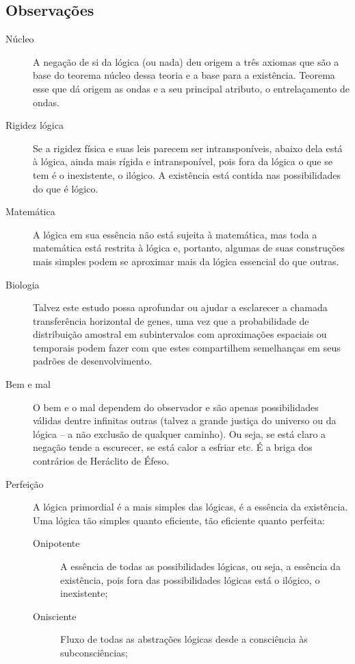\subsection{Observações}
	\begin{description}
	   \item[Núcleo] A negação de si da lógica (ou nada) deu origem a três axiomas que são a base do teorema núcleo dessa teoria e a base para a existência. Teorema esse que dá origem as ondas e a seu principal atributo, o entrelaçamento de ondas. 
	   \item[Rigidez lógica] Se a rigidez física e suas leis parecem ser intransponíveis, abaixo dela está à lógica, ainda mais rígida e intransponível, pois fora da lógica o que se tem é o inexistente, o ilógico. A existência está contida nas possibilidades do que é lógico. 
	   \item[Matemática] A lógica em sua essência não está sujeita à matemática, mas toda a matemática está restrita à lógica e, portanto, algumas de suas construções mais simples podem se aproximar mais da lógica essencial do que outras.
	   \item[Biologia] Talvez este estudo possa aprofundar ou ajudar a esclarecer a chamada transferência horizontal de genes, uma vez que a probabilidade de distribuição amostral em subintervalos com aproximações espaciais ou temporais podem fazer com que estes compartilhem semelhanças em seus padrões de desenvolvimento. 
	   \item[Bem e mal] O bem e o mal dependem do observador e são apenas possibilidades válidas dentre infinitas outras (talvez a grande justiça do universo ou da lógica – a não exclusão de qualquer caminho). Ou seja, se está claro a negação tende a escurecer, se está calor a esfriar etc. É a briga dos contrários de Heráclito de Éfeso. 
	   \item[Perfeição] A lógica primordial é a mais simples das lógicas, é a essência da existência. Uma lógica tão simples quanto eficiente, tão eficiente quanto perfeita:
	   \begin{description}
		   \item[Onipotente] A essência de todas as possibilidades lógicas, ou seja, a essência da existência, pois fora das possibilidades lógicas está o ilógico, o inexistente;
		   \item[Onisciente] Fluxo de todas as abstrações lógicas desde a consciência às subconsciências; 

\end{description}
\end{description}
